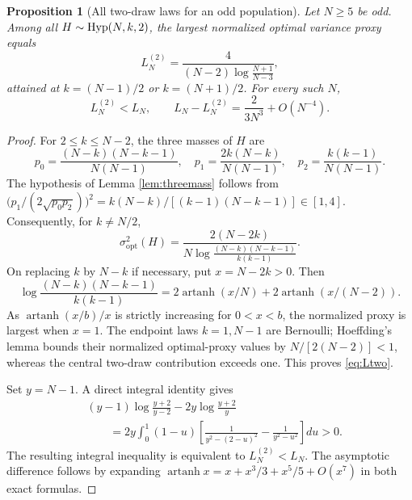 \documentclass[11pt,a4paper]{article}
\newtheorem{proposition}[theorem]{Proposition}
\begin{document}
\begin{proposition}[All two-draw laws for an odd population]\label{prop:odd2}
Let $N\ge5$ be odd. Among all $H\sim\operatorname{Hyp}(N,k,2)$, the largest normalized optimal variance proxy equals
\begin{equation}\label{eq:Ltwo}
 L_N^{(2)}=\frac{4}{(N-2)\log\frac{N+1}{N-3}},
\end{equation}
attained at $k=(N-1)/2$ or $k=(N+1)/2$. For every such $N$,
\begin{equation}\label{eq:twostrict}
 L_N^{(2)}<L_N,
 \qquad L_N-L_N^{(2)}=\frac{2}{3N^3}+O(N^{-4}).
\end{equation}
\end{proposition}
\begin{proof}
For $2\le k\le N-2$, the three masses of $H$ are
\[
 p_0=\frac{(N-k)(N-k-1)}{N(N-1)},\quad
 p_1=\frac{2k(N-k)}{N(N-1)},\quad
 p_2=\frac{k(k-1)}{N(N-1)}.
\]
The hypothesis of Lemma \ref{lem:threemass} follows from
$\bigl(p_1/(2\sqrt{p_0p_2})\bigr)^2=k(N-k)/[(k-1)(N-k-1)]\in[1,4]$.
Consequently, for $k\ne N/2$,
\[
 \sigma^2_{\mathrm{opt}}(H)
 =\frac{2(N-2k)}{N\log\frac{(N-k)(N-k-1)}{k(k-1)}}.
\]
On replacing $k$ by $N-k$ if necessary, put $x=N-2k>0$. Then
\[
 \log\frac{(N-k)(N-k-1)}{k(k-1)}
 =2\operatorname{artanh}(x/N)+2\operatorname{artanh}(x/(N-2)).
\]
As $\operatorname{artanh}(x/b)/x$ is strictly increasing for $0<x<b$, the normalized proxy is largest when $x=1$. The endpoint laws $k=1,N-1$ are Bernoulli; Hoeffding's lemma bounds their normalized optimal-proxy values by $N/[2(N-2)]<1$, whereas the central two-draw contribution exceeds one. This proves \eqref{eq:Ltwo}.

Set $y=N-1$. A direct integral identity gives
\begin{align*}
 &(y-1)\log\frac{y+2}{y-2}-2y\log\frac{y+2}{y}\\
 &\qquad=2y\int_0^1(1-u)
 \left[\frac1{y^2-(2-u)^2}-\frac1{y^2-u^2}\right]du>0.
\end{align*}
The resulting integral inequality is equivalent to $L_N^{(2)}<L_N$. The asymptotic difference follows by expanding $\operatorname{artanh}x=x+x^3/3+x^5/5+O(x^7)$ in both exact formulas.
\end{proof}
\end{document}
